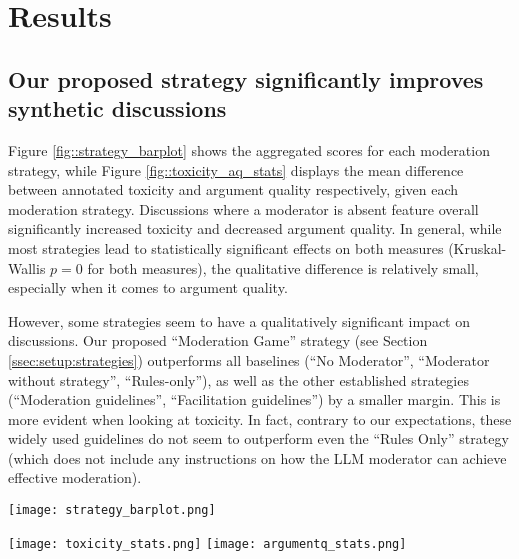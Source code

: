 %

\section{Results}



\subsection{Our proposed strategy significantly improves synthetic discussions}

Figure \ref{fig::strategy_barplot} shows the aggregated scores for each moderation strategy, while Figure \ref{fig::toxicity_aq_stats} displays the mean difference between annotated toxicity and argument quality respectively, given each moderation strategy. Discussions where a moderator is absent feature overall significantly increased toxicity and decreased argument quality. In general, while most strategies lead to statistically significant effects on both measures (Kruskal-Wallis $p=0$ for both measures), the qualitative difference is relatively small, especially when it comes to argument quality.

However, some strategies seem to have a qualitatively significant impact on discussions. Our proposed “Moderation Game” strategy (see Section \ref{ssec:setup:strategies}) outperforms all baselines (“No Moderator”, “Moderator without strategy”, “Rules-only”), as well as the other established strategies (“Moderation guidelines”, “Facilitation guidelines”) by a smaller margin. This is more evident when looking at toxicity.
In fact, contrary to our expectations, these widely used guidelines do not seem to outperform even the “Rules Only” strategy (which does not include any instructions on how the \ac{LLM} moderator can achieve effective moderation).

\begin{figure*}[t]
	\centering
	\texttt{[image: strategy\_barplot.png]}
	\caption{Effects of moderation strategy for toxicity and argument quality. Error bars represent the 95\% confidence interval. Less is better (e.g., Argument Quality = 1 represents very high quality discussions).}
	\label{fig::strategy_barplot}
\end{figure*}

\begin{figure*}[t]
    \texttt{[image: toxicity\_stats.png]} \hfill
    \texttt{[image: argumentq\_stats.png]}
	\centering
	\caption{Mean difference of Toxicity (left) and Argument Quality (right) between each moderation strategy. $A[i, j] = 0.3^{***}$ indicates that the strategy $j$ is better than the strategy $i$ for an average of $0.3$ points with $p<0.001$. Each comparison is accompanied by Dunn's posthoc test for multiple comparisons \cite{dunn}, in the form of significance asterisks.}
	\label{fig::toxicity_aq_stats}
\end{figure*}


